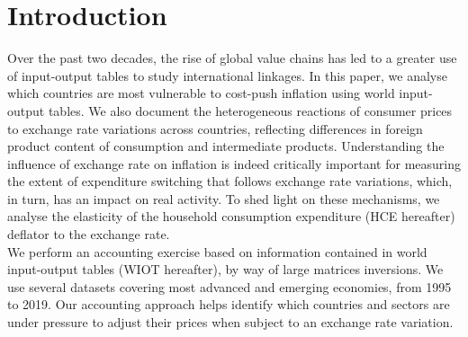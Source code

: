 \documentclass[11pt,a4paper]{paper} %
\begin{document}

\newpage 
\section*{Introduction}

Over the past two decades, the rise of global value chains has led to a greater use of input-output tables to study international linkages. 
In this paper, we analyse which countries are most vulnerable to cost-push inflation using world input-output tables. 
We also document the heterogeneous reactions of consumer prices to exchange rate variations across countries, reflecting differences in foreign product content of consumption and intermediate products. 
Understanding the influence of exchange rate on inflation is indeed critically important for measuring the extent of expenditure switching that follows exchange rate variations, which, in turn, has an impact on real activity.
To shed light on these mechanisms, we analyse the elasticity of the household consumption expenditure (HCE hereafter) deflator to the exchange rate.\\
We perform an accounting exercise based on information contained in world input-output tables (WIOT hereafter), by way of large matrices inversions.
We use several datasets covering most advanced and emerging economies, from 1995 to 2019. 
Our accounting approach helps identify which countries and sectors are under pressure to adjust their prices when subject to an exchange rate variation.\\
\end{document}
